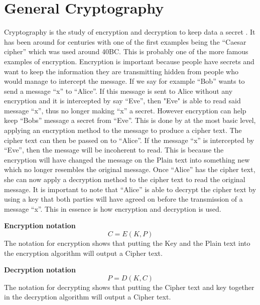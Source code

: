 \documentclass[11pt,a4paper, notitlepage]{report}
\begin{document}
\section{General Cryptography}
\label{sec:GenCrypt}

Cryptography is the study of encryption and decryption to keep data a secret \cite{DBLP:series/isc/DelfsK07}. It has been around for centuries with one of the first examples being the “Caesar cipher” which was used around 40BC. This is probably one of the more famous examples of encryption.
Encryption is important because people have secrets and want to keep the information they are transmitting hidden from people who would manage to intercept the message. If we say for example “Bob” wants to send a message “x” to “Alice”. If this message is sent to Alice without any encryption and it is intercepted by say “Eve”, then "Eve" is able to read said message “x”, thus no longer making “x” a secret. However encryption can help keep “Bobs” message a secret from “Eve”. This is done by at the most basic level, applying an encryption method to the message to produce a cipher text. The cipher text can then be passed on to “Alice”. If the message “x” is intercepted by “Eve”, then the message will be incoherent to read. This is because the encryption will have changed the message on the Plain text into something new which no longer resembles the original message. Once “Alice” has the cipher text, she can now apply a decryption method to the cipher text to read the original message. It is important to note that “Alice” is able to decrypt the cipher text by using a key that both parties will have agreed on before the transmission of a message “x”. This in essence is how encryption and decryption is used.

\textbf{Encryption notation}
\begin{displaymath}
C = E (K, P)
\end{displaymath}
The notation for encryption shows that putting the Key and the Plain text into the encryption algorithm will output a Cipher text.

\textbf{Decryption notation}
\begin{displaymath}
P = D (K, C)
\end{displaymath}
The notation for decrypting shows that putting the Cipher text and key together in the decryption algorithm will output a Cipher text.
\end{document}
